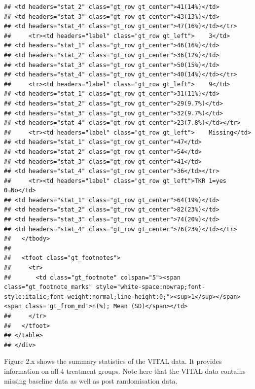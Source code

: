 \documentclass{article}
\begin{document}
\begin{verbatim}
## <td headers="stat_2" class="gt_row gt_center">41(14%)</td>
## <td headers="stat_3" class="gt_row gt_center">43(13%)</td>
## <td headers="stat_4" class="gt_row gt_center">47(16%)</td></tr>
##     <tr><td headers="label" class="gt_row gt_left">    3</td>
## <td headers="stat_1" class="gt_row gt_center">46(16%)</td>
## <td headers="stat_2" class="gt_row gt_center">36(12%)</td>
## <td headers="stat_3" class="gt_row gt_center">50(15%)</td>
## <td headers="stat_4" class="gt_row gt_center">40(14%)</td></tr>
##     <tr><td headers="label" class="gt_row gt_left">    9</td>
## <td headers="stat_1" class="gt_row gt_center">31(11%)</td>
## <td headers="stat_2" class="gt_row gt_center">29(9.7%)</td>
## <td headers="stat_3" class="gt_row gt_center">32(9.7%)</td>
## <td headers="stat_4" class="gt_row gt_center">23(7.8%)</td></tr>
##     <tr><td headers="label" class="gt_row gt_left">    Missing</td>
## <td headers="stat_1" class="gt_row gt_center">47</td>
## <td headers="stat_2" class="gt_row gt_center">54</td>
## <td headers="stat_3" class="gt_row gt_center">41</td>
## <td headers="stat_4" class="gt_row gt_center">36</td></tr>
##     <tr><td headers="label" class="gt_row gt_left">TKR 1=yes 0=No</td>
## <td headers="stat_1" class="gt_row gt_center">64(19%)</td>
## <td headers="stat_2" class="gt_row gt_center">82(23%)</td>
## <td headers="stat_3" class="gt_row gt_center">74(20%)</td>
## <td headers="stat_4" class="gt_row gt_center">76(23%)</td></tr>
##   </tbody>
##   
##   <tfoot class="gt_footnotes">
##     <tr>
##       <td class="gt_footnote" colspan="5"><span class="gt_footnote_marks" style="white-space:nowrap;font-style:italic;font-weight:normal;line-height:0;"><sup>1</sup></span> <span class='gt_from_md'>n(%); Mean (SD)</span></td>
##     </tr>
##   </tfoot>
## </table>
## </div>
\end{verbatim}

Figure 2.x shows the summary statistics of the VITAL data. It provides
information on all 4 treatment groups. Note here that the VITAL data
contains missing baseline data as well as post randomisation data.
\end{document}
